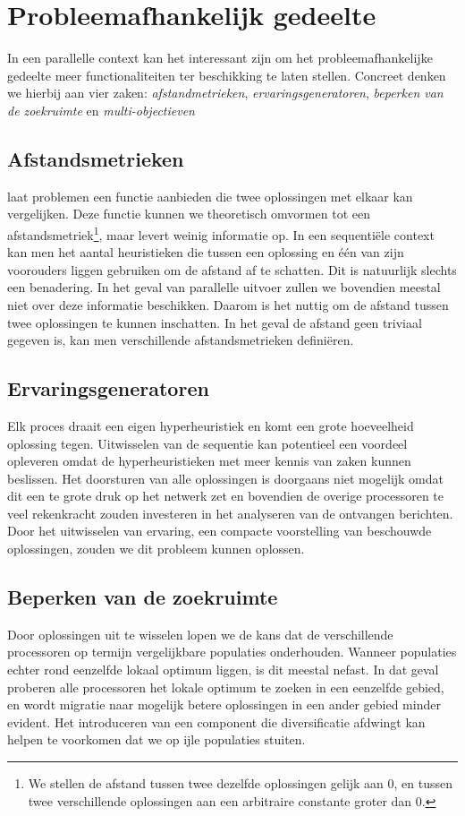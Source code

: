 \section{Probleemafhankelijk gedeelte}

In een parallelle context kan het interessant zijn om het probleemafhankelijke gedeelte meer functionaliteiten ter beschikking te laten stellen. Concreet denken we hierbij aan vier zaken: \emph{afstandmetrieken}, \emph{ervaringsgeneratoren}, \emph{beperken van de zoekruimte} en \emph{multi-objectieven}

\subsection{Afstandsmetrieken}
\abhf{} laat problemen een functie aanbieden die twee oplossingen met elkaar kan vergelijken. Deze functie kunnen we theoretisch omvormen tot een afstandsmetriek\footnote{We stellen de afstand tussen twee dezelfde oplossingen gelijk aan 0, en tussen twee verschillende oplossingen aan een arbitraire constante groter dan 0.}, maar levert weinig informatie op. In een sequenti\"ele context kan men het aantal heuristieken die tussen een oplossing en \'e\'en van zijn voorouders liggen gebruiken om de afstand af te schatten. Dit is natuurlijk slechts een benadering. In het geval van parallelle uitvoer zullen we bovendien meestal niet over deze informatie beschikken. Daarom is het nuttig om de afstand tussen twee oplossingen te kunnen inschatten. In het geval de afstand geen triviaal gegeven is, kan men verschillende afstandsmetrieken defini\"eren.
 
\subsection{Ervaringsgeneratoren}
Elk proces draait een eigen hyperheuristiek en komt een grote hoeveelheid oplossing tegen. Uitwisselen van de sequentie kan potentieel een voordeel opleveren omdat de hyperheuristieken met meer kennis van zaken kunnen beslissen. Het doorsturen van alle oplossingen is doorgaans niet mogelijk omdat dit een te grote druk op het netwerk zet en bovendien de overige processoren te veel rekenkracht zouden investeren in het analyseren van de ontvangen berichten. Door het uitwisselen van ervaring, een compacte voorstelling van beschouwde oplossingen, zouden we dit probleem kunnen oplossen.

\subsection{Beperken van de zoekruimte}
Door oplossingen uit te wisselen lopen we de kans dat de verschillende processoren op termijn vergelijkbare populaties onderhouden. Wanneer populaties echter rond eenzelfde lokaal optimum liggen, is dit meestal nefast\cite{parallelgeneticalgorithms}. In dat geval proberen alle processoren het lokale optimum te zoeken in een eenzelfde gebied, en wordt migratie naar mogelijk betere oplossingen in een ander gebied minder evident. Het introduceren van een component die diversificatie afdwingt kan helpen te voorkomen dat we op ijle populaties stuiten.

